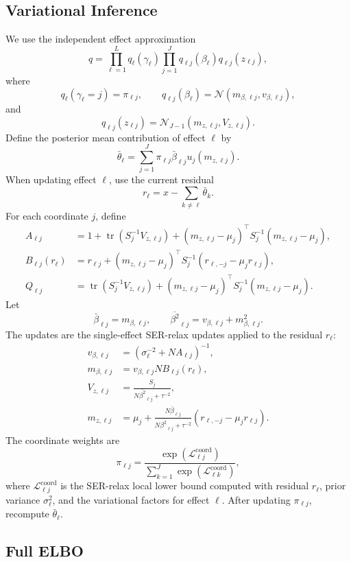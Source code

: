 \documentclass[11pt]{article}
\newcommand{\tr}{\operatorname{tr}}
\newcommand{\Normal}{\mathcal N}
\begin{document}
\subsection{Variational Inference}

We use the independent effect approximation
\[
q=
\prod_{\ell=1}^L
q_\ell(\gamma_\ell)
\prod_{j=1}^J
q_{\ell j}(\beta_\ell)q_{\ell j}(z_{\ell j}),
\]
where
\[
q_\ell(\gamma_\ell=j)=\pi_{\ell j},\qquad
q_{\ell j}(\beta_\ell)
=
\Normal(m_{\beta,\ell j},v_{\beta,\ell j}),
\]
and
\[
q_{\ell j}(z_{\ell j})
=
\Normal_{J-1}(m_{z,\ell j},V_{z,\ell j}).
\]
Define the posterior mean contribution of effect \(\ell\) by
\[
\bar\theta_\ell
=
\sum_{j=1}^J
\pi_{\ell j}\bar\beta_{\ell j}u_j(m_{z,\ell j}).
\]
When updating effect \(\ell\), use the current residual
\[
r_\ell=x-\sum_{k\ne\ell}\bar\theta_k.
\]
For each coordinate \(j\), define
\begin{align}
A_{\ell j}
&=
1+\tr(S_j^{-1}V_{z,\ell j})
+(m_{z,\ell j}-\mu_j)^\top S_j^{-1}
(m_{z,\ell j}-\mu_j),\\
B_{\ell j}(r_\ell)
&=
r_{\ell j}
+(m_{z,\ell j}-\mu_j)^\top S_j^{-1}
(r_{\ell,-j}-\mu_jr_{\ell j}),\\
Q_{\ell j}
&=
\tr(S_j^{-1}V_{z,\ell j})
+(m_{z,\ell j}-\mu_j)^\top S_j^{-1}
(m_{z,\ell j}-\mu_j).
\end{align}
Let
\[
\bar\beta_{\ell j}=m_{\beta,\ell j},\qquad
\overline{\beta^2}_{\ell j}
=
v_{\beta,\ell j}+m_{\beta,\ell j}^2.
\]
The updates are the single-effect SER-relax updates applied to the
residual \(r_\ell\):
\begin{align}
v_{\beta,\ell j}
&=
\left(\sigma_\ell^{-2}+NA_{\ell j}\right)^{-1},\\
m_{\beta,\ell j}
&=
v_{\beta,\ell j}NB_{\ell j}(r_\ell),\\
V_{z,\ell j}
&=
\frac{S_j}{N\overline{\beta^2}_{\ell j}+\tau^{-2}},\\
m_{z,\ell j}
&=
\mu_j+
\frac{N\bar\beta_{\ell j}}
{N\overline{\beta^2}_{\ell j}+\tau^{-2}}
(r_{\ell,-j}-\mu_jr_{\ell j}).
\end{align}
The coordinate weights are
\[
\pi_{\ell j}
=
\frac{
\exp(\mathcal L_{\ell j}^{\mathrm{coord}})
}{
\sum_{k=1}^J
\exp(\mathcal L_{\ell k}^{\mathrm{coord}})
},
\]
where \(\mathcal L_{\ell j}^{\mathrm{coord}}\) is the SER-relax local
lower bound computed with residual \(r_\ell\), prior variance
\(\sigma_\ell^2\), and the variational factors for effect \(\ell\).
After updating \(\pi_{\ell j}\), recompute \(\bar\theta_\ell\).

\subsection{Full ELBO}
\end{document}
